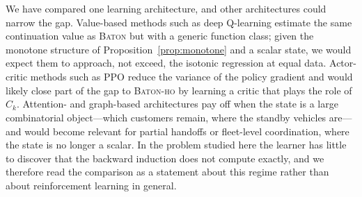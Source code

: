 \documentclass[preprint,authoryear,12pt]{elsarticle}
\theoremstyle{definition}
\theoremstyle{remark}
\begin{document}
We have compared one learning architecture, and other architectures
could narrow the gap. Value-based methods such as deep Q-learning
estimate the same continuation value as \textsc{Baton} but with a
generic function class; given the monotone structure of
Proposition~\ref{prop:monotone} and a scalar state, we would expect them
to approach, not exceed, the isotonic regression at equal data.
Actor-critic methods such as PPO reduce the variance of the policy
gradient and would likely close part of the gap to \textsc{Baton-ho}
by learning a critic that plays the role of $\widehat C_k$. Attention-
and graph-based architectures pay off when the state is a large
combinatorial object---which customers remain, where the standby
vehicles are---and would become relevant for partial handoffs or
fleet-level coordination, where the state is no longer a scalar. In the
problem studied here the learner has little to discover that the
backward induction does not compute exactly, and we therefore read the
comparison as a statement about this regime rather than about
reinforcement learning in general.
\end{document}
